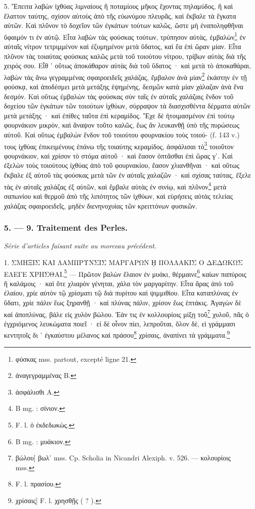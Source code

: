 \documentclass[a4paper, 11pt, oneside, polutonikogreek, french]{article}
\begin{document}
5. Ἔπειτα λαβὼν ἰχθύας λιμναίους ἢ ποταμίους μῆκος ἔχοντας πηλαμύδος, ἢ καὶ ἔλαττον ταύτης, σχίσον αὐτοὺς ἀπὸ τῆς εὐωνύμου πλευρᾶς, καὶ ἔκβαλε τὰ ἔγκατα αὐτῶν. Καὶ πλῦνον τὸ δοχεῖον τῶν ἐγκάτων τούτων καλῶς, ὥστε μὴ ἐναποληφθῆναι ὕφαιμόν τι ἐν αὐτῷ. Εἶτα λαβὼν τὰς φούσκας τούτων, τρύπησον αὐτὰς, ἐμβαλὼν\footnote{φύσκας mss. partout, excepté ligne 21.} ἐν αὐταῖς νίτρον τετριμμένον καὶ ἐζυμημένον μετὰ ὕδατος, καὶ ἔα ἐπὶ ὥραν μίαν. Εἶτα πλῦνον τὰς τοιαύτας φούσκας καλῶς μετὰ τοῦ τοιούτου νίτρου, τρίβων αὐτὰς διὰ τῆς χειρός σου. Εἶθ ᾽ οὕτως ἀποκάθαρον αὐτὰς διὰ τοῦ ὕδατος · καὶ μετὰ τὸ ἀποκαθάραι, λαβὼν τὰς ἄνω γεγραμμένας σφαιροειδεῖς χαλάζας, ἔμβαλον ἀνὰ μίαν\footnote{ἀναγεγραμμένας B.} ἑκάστην ἐν τῇ φούσκᾳ, καὶ ἀποδέσμει μετὰ μετάξης ἑψημένης, δεσμῶν κατὰ μίαν χάλαζαν ἀνὰ ἕνα δεσμόν. Καὶ οὕτως ἐμβαλὼν τὰς φούσκας σὺν ταῖς ἐν αὐταῖς χαλάζαις ἔνδον τοῦ δοχείου τῶν ἐγκάτων τῶν τοιούτων ἰχθύων, σύρραψον τὰ διασχισθέντα δέρματα αὐτῶν μετὰ μετάξης · καὶ ἐπίθες ταῦτα ἐπὶ κεραμίδος. Ἔχε δὲ ἡτοιμασμένον ἐπὶ τούτῳ φουρνάκιον μικρὸν, καὶ ἄναψον τοῦτο καλῶς, ἕως ἂν λευκανθῇ ὑπὸ τῆς πυρώσεως αὐτοῦ. Καὶ οὕτως ἐμβαλὼν ἔνδον τοῦ τοιούτου φουρνακίου τοὺς τοιού- (f. 143 v.) τους ἰχθύας ἐπικειμένους ἐπάνω τῆς τοιαύτης κεραμίδος, ἀσφάλισαι τὸ\footnote{ἀσφάλισθι A.} τοιοῦτον φουρνάκιον, καὶ χρίσον τὸ στόμα αὐτοῦ · καὶ ἔασον ὀπτᾶσθαι ἐπὶ ὥρας γʹ. Καὶ ἐξελὼν τοὺς τοιούτους ἰχθύας ἀπὸ τοῦ φουρνακίου, ἔασον χλιανθῆναι · καὶ οὕτως ἔκβαλε ἐξ αὐτοῦ τὰς φούσκας μετὰ τῶν ἐν αὐταῖς χαλαζῶν · καὶ σχίσας ταύτας, ἔξελε τὰς ἐν αὐταῖς χαλάζας ἐξ αὐτῶν, καὶ ἔμβαλε αὐτὰς ἐν σινίῳ, καὶ πλῦνον\footnote{B mg. : σίνιον.} μετὰ σαπωνίου καὶ θερμοῦ ἀπὸ τῆς λιπότητος τῶν ἰχθύων, καὶ εὑρήσεις αὐτὰς τελείας χαλάζας σφαιροειδεῖς, μηδὲν διενηνοχυίας τῶν κρειττόνων φυσικῶν.

\bigskip
\centerline{\EightStarTaper}
\centerline{\EightStarTaper\EightStarTaper}
\bigskip

\subsubsection{5. --- 9. Traitement des Perles.}

\emph{Série d'articles faisant suite au morceau précédent.}

1. ΣΜΗΞΙΣ ΚΑΙ ΛΑΜΠΡΥΝΣΙΣ ΜΑΡΓΑΡΩΝ ῌ ΠΟΛΛΑΚΙΣ Ο ΔΕΔΩΚΩΣ ΕΛΕΓΕ ΧΡΗΣΘΑΙ.\footnote{F. l. ὁ ἐκδεδωκὼς.} --- Πρῶτον βαλὼν ἔλαιον ἐν μυάκι, θέρμαινε\footnote{B mg. : μυάκιον.} καίων παπύροις ἢ καλάμοις · καὶ ὅτε χλιαρὸν γένηται, χάλα τὸν μαργαρίτην. Εἶτα ἄρας ἀπὸ τοῦ ἐλαίου, χρίε αὐτὸν τῷ χρίσματι τῷ διὰ πυρίτου καὶ ψιμμιθίου. Εἶτα καταπλύνας ἐν ὕδατι, χρίε πάλιν ἕως ξηρανθῇ · καὶ πλύνας πάλιν, χρίσον ἕως ἑπτάκις. Ἀγαγὼν δὲ καὶ ἀποπλύνας, βάλε εἰς χυλὸν βώλου. Ἐὰν τις ἐν κολλουρίοις μίξῃ τοῦ\footnote{βώλου] βωλʹ mss. Cp. Scholia in Nicandri Alexiph. v. 526. --- κολουρίοις mss.} χυλοῦ, πᾶς ὁ ἐγχριόμενος λευκώματα ποιεῖ · εἰ δὲ οἶνον πίει, λεπροῦται, ὅλον δὲ, εἰ γράμμασι κεντητοῖς δι ᾽ ἐγκαύστου μέλανος καὶ πράσου\footnote{F. l. πρασίου.} χρίσαις, ἀναπίνει τὰ γράμματα.\footnote{χρίσαις] F. l. χρησθῇς ( ? ).}
\end{document}
